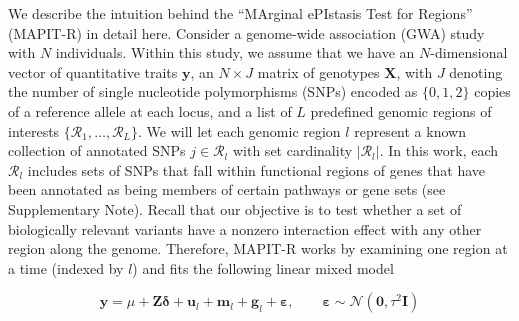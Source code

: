 \documentclass[10pt]{article}
\newcommand{\bg}{\mathbf{g}}
\newcommand{\by}{\mathbf{y}}
\newcommand{\bu}{\mathbf{u}}
\newcommand{\bfm}{\mathbf{m}}
\newcommand{\bX}{\mathbf{X}}
\newcommand{\bZ}{\mathbf{Z}}
\newcommand{\bI}{\mathbf{I}}
\newcommand{\N}{\mathcal{N}}
\newcommand{\bvarepsilon}{\boldsymbol\varepsilon}
\newcommand{\bdelta}{\boldsymbol\delta}
\begin{document}
We describe the intuition behind the ``MArginal ePIstasis Test for Regions'' (MAPIT-R) in detail here. Consider a genome-wide association (GWA) study with $N$ individuals. Within this study, we assume that we have an $N$-dimensional vector of quantitative traits $\by$, an $N\times J$ matrix of genotypes $\bX$, with $J$ denoting the number of single nucleotide polymorphisms (SNPs) encoded as $\{0,1,2\}$ copies of a reference allele at each locus, and a list of $L$ predefined genomic regions of interests $\{\mathcal{R}_1,\ldots,\mathcal{R}_L\}$. We will let each genomic region $l$ represent a known collection of annotated SNPs $j\in\mathcal{R}_l$ with set cardinality $|\mathcal{R}_l|$. In this work, each $\mathcal{R}_l$ includes sets of SNPs that fall within functional regions of genes that have been annotated as being members of certain pathways or gene sets (see Supplementary Note). Recall that our objective is to test whether a set of biologically relevant variants have a nonzero interaction effect with any other region along the genome. Therefore, MAPIT-R works by examining one region at a time (indexed by $l$) and fits the following linear mixed model
\begin{linenomath*}
\begin{equation}
\by = \mu +\bZ\bdelta + \bu_l + \bfm_l + \bg_l +\bvarepsilon, \quad\quad \bvarepsilon\sim\N(\bm{0},\tau^2\bI)\label{mapit_r}
\end{equation}
\end{linenomath*}
\end{document}
